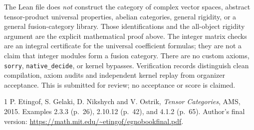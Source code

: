 \documentclass[11pt]{article}
\begin{document}
The Lean file does \emph{not} construct the category of complex vector spaces,
abstract tensor-product universal properties, abelian categories, general
rigidity, or a general fusion-category library. Those identifications and the
all-object rigidity argument are the explicit mathematical proof above. The
integer matrix checks are an integral certificate for the universal coefficient
formulas; they are not a claim that integer modules form a fusion category.
There are no custom axioms, \texttt{sorry}, \texttt{native\_decide}, or kernel
bypasses. Verification records distinguish clean compilation, axiom audits and
independent kernel replay from organizer acceptance. This is submitted for
review; no acceptance or score is claimed.

\begin{thebibliography}{1}
 P. Etingof, S. Gelaki, D. Nikshych and V. Ostrik,
\emph{Tensor Categories}, AMS, 2015. Examples 2.3.3 (p.~26),
2.10.12 (p.~42), and 4.1.2 (p.~65).
Author's final version:
\url{https://math.mit.edu/~etingof/egnobookfinal.pdf}.
\end{thebibliography}
\end{document}
